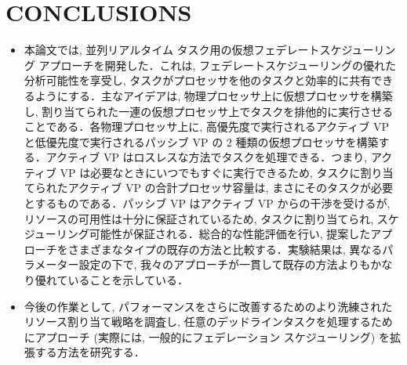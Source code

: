 
\section{CONCLUSIONS}
\label{sec: conclusions}

\begin{frame}{}
    \begin{itemize}
        \item 本論文では, 並列リアルタイム タスク用の仮想フェデレートスケジューリング アプローチを開発した．これは, フェデレートスケジューリングの優れた分析可能性を享受し, タスクがプロセッサを他のタスクと効率的に共有できるようにする．主なアイデアは, 物理プロセッサ上に仮想プロセッサを構築し, 割り当てられた一連の仮想プロセッサ上でタスクを排他的に実行させることである．各物理プロセッサ上に, 高優先度で実行されるアクティブ VP と低優先度で実行されるパッシブ VP の 2 種類の仮想プロセッサを構築する．アクティブ VP はロスレスな方法でタスクを処理できる．つまり, アクティブ VP は必要なときにいつでもすぐに実行できるため, タスクに割り当てられたアクティブ VP の合計プロセッサ容量は, まさにそのタスクが必要とするものである．パッシブ VP はアクティブ VP からの干渉を受けるが, リソースの可用性は十分に保証されているため, タスクに割り当てられ, スケジューリング可能性が保証される．総合的な性能評価を行い, 提案したアプローチをさまざまなタイプの既存の方法と比較する．実験結果は, 異なるパラメーター設定の下で, 我々のアプローチが一貫して既存の方法よりもかなり優れていることを示している．
    \end{itemize}
\end{frame}

\begin{frame}{}
    \begin{itemize}
        \item 今後の作業として, パフォーマンスをさらに改善するためのより洗練されたリソース割り当て戦略を調査し, 任意のデッドラインタスクを処理するためにアプローチ (実際には, 一般的にフェデレーション スケジューリング) を拡張する方法を研究する．
    \end{itemize}
\end{frame}
